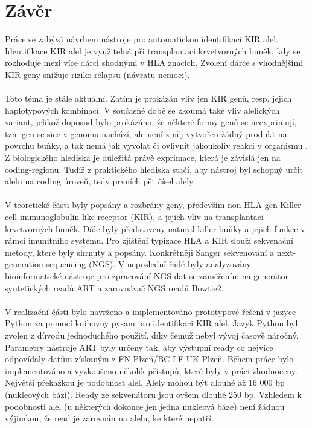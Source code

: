\documentclass[czech,DP]{thesiskiv}
\numberwithin{equation}{section}
\begin{document}
\chapter{Závěr}
Práce se zabývá návrhem nástroje pro automatickou identifikaci KIR alel. Identifikace KIR alel je využitelná při transplantaci krvetvorných buněk, kdy se rozhoduje mezi více dárci shodnými v HLA znacích. Zvolení dárce s vhodnějšími KIR geny snižuje riziko relapsu (návratu nemoci).
\\
\\
Toto téma je stále aktuální. Zatím je prokázán vliv jen KIR genů, resp. jejich haplotypových kombinací. V současné době se zkoumá také vliv alelických variant, jelikož doposud bylo prokázáno, že některé formy genů se neexprimují, tzn. gen se sice v genomu nachází, ale není z něj vytvořen žádný produkt na povrchu buňky, a tak nemá jak vyvolat či ovlivnit jakoukoliv reakci v organismu \cite{exprimace_zaver}. Z biologického hlediska je důležitá právě exprimace, která je závislá jen na coding-regionu. Tudíž z praktického hlediska stačí, aby nástroj byl schopný určit alelu na coding úroveň, tedy prvních pět čísel alely. 
\\
\\
V teoretické části byly popsány a rozbrány geny, především non-HLA gen Killer-cell immunoglobulin-like receptor (KIR), a jejich vliv na transplantaci krvetvorných buněk. Dále byly představeny natural killer buňky a jejich funkce v rámci imunitního systému. Pro zjištění typizace HLA a KIR slouží sekvenační metody, které byly shrnuty a popsány. Konkrétněji Sanger sekvenování a next-generation sequencing (NGS). V neposlední řadě byly analyzovány bioinformatické nástroje pro zpracování NGS dat se zaměřením na generátor syntetických readů ART a zarovnávač NGS readů Bowtie2.
\\
\\
V realizační části bylo navrženo a implementováno prototypové řešení v jazyce Python za pomocí knihovny pysam pro identifikaci KIR alel. Jazyk Python byl zvolen z důvodu jednoduchého použití, díky čemuž nebyl vývoj časově náročný. Parametry nástroje ART byly určeny tak, aby výstupní ready co nejvíce odpovídaly datům získaným z FN Plzeň/BC LF UK Plzeň. Během práce bylo implementováno a vyzkoušeno několik přístupů, které byly v práci zhodnoceny. Největší překážkou je podobnost alel. Alely mohou být dlouhé až 16 000 bp (nukleových bází). Ready ze sekvenátoru jsou ovšem dlouhé 250 bp. Vzhledem k podobnosti alel (u některých dokonce jen jedna nukleová báze) není žádnou výjimkou, že read je zarovnán na alelu, ke které nepatří. 
\end{document}
